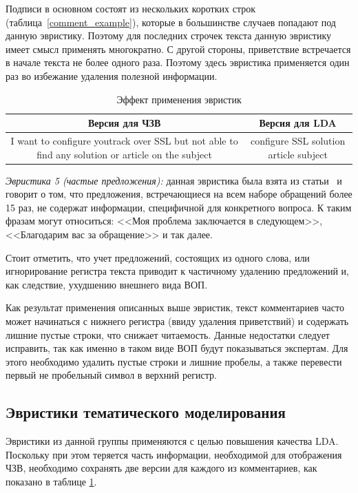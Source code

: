 Подписи в основном состоят из нескольких коротких строк (таблица~\ref{comment_example}), которые в большинстве случаев попадают под данную эвристику. Поэтому для последних строчек текста данную эвристику имеет смысл применять многократно. С другой стороны, приветствие встречается в начале текста не более одного раза. Поэтому здесь эвристика применяется один раз во избежание удаления полезной информации.

\begin{table}[!ht]
\caption{Эффект применения эвристик}
\label{heuristics_table}
\centering
\begin{tabular}{|c|c|}
\hline
Версия для ЧЗВ & Версия для LDA \\
\hline
\parbox[t]{4cm}{I want to configure youtrack over SSL but
not able to find any solution or article on the subject} & \parbox[t]{4cm}{configure SSL solution article subject}\\
\hline
\end{tabular}
\end{table}

\textit{Эвристика 5 (частые предложения):} данная эвристика была взята из статьи~\cite{original} и говорит о том, что предложения, встречающиеся на всем наборе обращений более 15 раз, не содержат информации, специфичной для конкретного вопроса. К таким фразам могут относиться: <<Моя проблема заключается в следующем>>, <<Благодарим вас за обращение>> и так далее.

Стоит отметить, что учет предложений, состоящих из одного слова, или игнорирование регистра текста приводит к частичному удалению предложений и, как следствие, ухудшению внешнего вида ВОП.

Как результат применения описанных выше эвристик, текст комментариев часто может начинаться с нижнего регистра (ввиду удаления приветствий) и содержать лишние пустые строки, что снижает читаемость. Данные недостатки следует исправить, так как именно в таком виде ВОП будут показываться экспертам. Для этого необходимо удалить пустые строки и лишние пробелы, а также перевести первый не пробельный символ в верхний регистр.

\subsection{Эвристики тематического моделирования}
\label{subsec:ldaheur}

Эвристики из данной группы применяются с целью повышения качества LDA. Поскольку при этом теряется часть информации, необходимой для отображения ЧЗВ, необходимо сохранять две версии для каждого из комментариев, как показано в таблице \ref{heuristics_table}.

